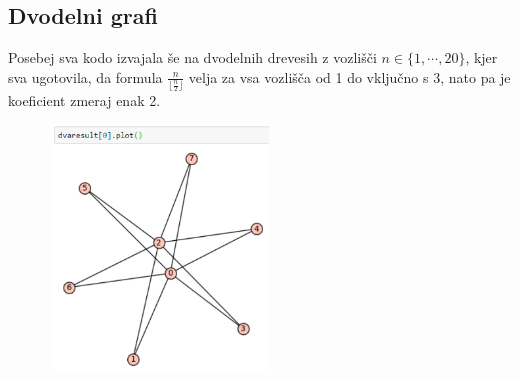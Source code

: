 \documentclass[a4paper]{article}
\begin{document}
\subsection{Dvodelni grafi}
Posebej sva kodo izvajala še na dvodelnih drevesih z vozlišči $n \in \{1, \cdots, 20\}$, kjer sva ugotovila, da formula $\frac{n}{\lfloor{\frac{n}{2}}\rfloor}$ velja za vsa vozlišča od 1 do vključno s 3, nato pa je koeficient zmeraj enak 2.

\begin{figure}[h!]
    \centering
    \includegraphics[width=6cm, height=6.5cm]{Slika18}
    \label{fig:mesh1}
\end{figure}
\end{document}
